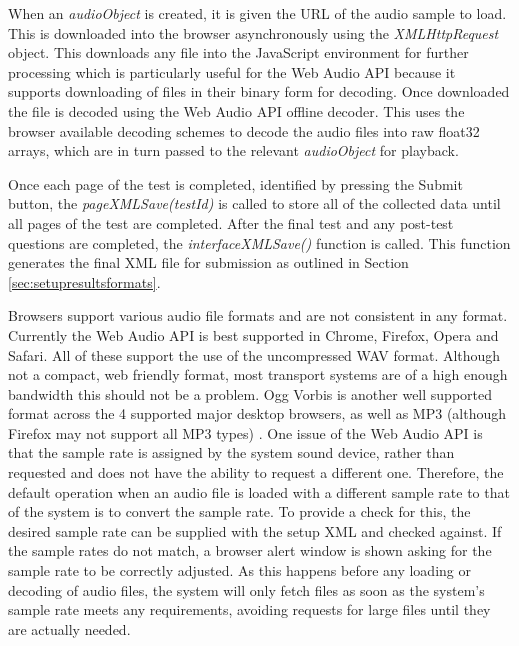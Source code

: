 \documentclass{article}
\begin{document}
When an \textit{audioObject} is created, it is given the URL of the audio sample to load. This is downloaded into the browser asynchronously using the \textit{XMLHttpRequest} object. This downloads any file into the JavaScript environment for further processing which is particularly useful for the Web Audio API because it supports downloading of files in their binary form for decoding. Once downloaded the file is decoded using the Web Audio API offline decoder. This uses the browser available decoding schemes to decode the audio files into raw float32 arrays, which are in turn passed to the relevant \textit{audioObject} for playback.

Once each page of the test is completed, identified by pressing the Submit button, the \textit{pageXMLSave(testId)} is called to store all of the collected data until all pages of the test are completed. After the final test and any post-test questions are completed, the \textit{interfaceXMLSave()} function is called. This function generates the final XML file for submission as outlined in Section \ref{sec:setupresultsformats}.

Browsers support various audio file formats and are not consistent in any format. Currently the Web Audio API is best supported in Chrome, Firefox, Opera and Safari. All of these support the use of the uncompressed WAV format. Although not a compact, web friendly format, most transport systems are of a high enough bandwidth this should not be a problem. Ogg Vorbis is another well supported format across the 4 supported major desktop browsers, as well as MP3 (although Firefox may not support all MP3 types) \cite{mozdevSupportedMedia}. %
One issue of the Web Audio API is that the sample rate is assigned by the system sound device, rather than requested and does not have the ability to request a different one. %
 Therefore, the default operation when an audio file is loaded with a different sample rate to that of the system is to convert the sample rate. To provide a check for this, the desired sample rate can be supplied with the setup XML and checked against. If the sample rates do not match, a browser alert window is shown asking for the sample rate to be correctly adjusted. 
As this happens before any loading or decoding of audio files, the system will only fetch files as soon as the system's sample rate meets any requirements, avoiding requests for large files until they are actually needed.
\end{document}
